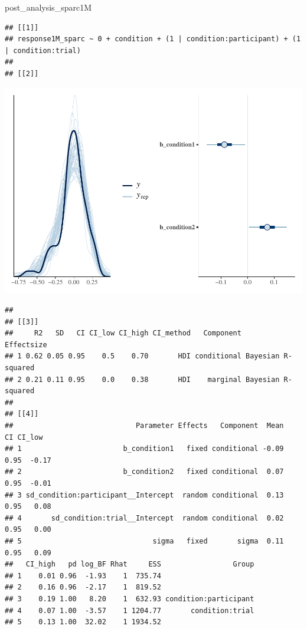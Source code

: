 \documentclass[
]{article}
\newenvironment{Shaded}{\begin{snugshade}}{\end{snugshade}}
\newcommand{\NormalTok}[1]{#1}
\begin{document}
\begin{Shaded}
\begin{Highlighting}[]
\NormalTok{post\_analysis\_sparc1M}
\end{Highlighting}
\end{Shaded}

\begin{verbatim}
## [[1]]
## response1M_sparc ~ 0 + condition + (1 | condition:participant) + (1 | condition:trial) 
## 
## [[2]]
\end{verbatim}

\includegraphics{06_Publish_GUSO_ASIL_files/figure-latex/Diagnostiics1M-2.pdf}

\begin{verbatim}
## 
## [[3]]
##     R2   SD   CI CI_low CI_high CI_method   Component         Effectsize
## 1 0.62 0.05 0.95    0.5    0.70       HDI conditional Bayesian R-squared
## 2 0.21 0.11 0.95    0.0    0.38       HDI    marginal Bayesian R-squared
## 
## [[4]]
##                             Parameter Effects   Component  Mean   CI CI_low
## 1                        b_condition1   fixed conditional -0.09 0.95  -0.17
## 2                        b_condition2   fixed conditional  0.07 0.95  -0.01
## 3 sd_condition:participant__Intercept  random conditional  0.13 0.95   0.08
## 4       sd_condition:trial__Intercept  random conditional  0.02 0.95   0.00
## 5                               sigma   fixed       sigma  0.11 0.95   0.09
##   CI_high   pd log_BF Rhat     ESS                 Group
## 1    0.01 0.96  -1.93    1  735.74                      
## 2    0.16 0.96  -2.17    1  819.52                      
## 3    0.19 1.00   8.20    1  632.93 condition:participant
## 4    0.07 1.00  -3.57    1 1204.77       condition:trial
## 5    0.13 1.00  32.02    1 1934.52
\end{verbatim}
\end{document}
